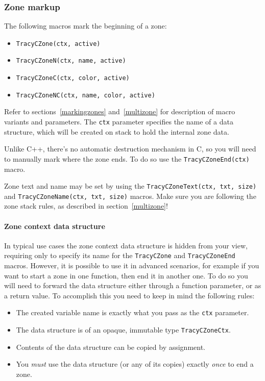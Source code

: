 \documentclass[hidelinks,titlepage,a4paper]{article}
\begin{document}
\subsubsection{Zone markup}

The following macros mark the beginning of a zone:

\begin{itemize}
\item \texttt{TracyCZone(ctx, active)}
\item \texttt{TracyCZoneN(ctx, name, active)}
\item \texttt{TracyCZoneC(ctx, color, active)}
\item \texttt{TracyCZoneNC(ctx, name, color, active)}
\end{itemize}

Refer to sections~\ref{markingzones} and~\ref{multizone} for description of macro variants and parameters. The \texttt{ctx} parameter specifies the name of a data structure, which will be created on stack to hold the internal zone data.

Unlike C++, there's no automatic destruction mechanism in C, so you will need to manually mark where the zone ends. To do so use the \texttt{TracyCZoneEnd(ctx)} macro.

Zone text and name may be set by using the \texttt{TracyCZoneText(ctx, txt, size)} and \texttt{TracyCZoneName(ctx, txt, size)} macros. Make sure you are following the zone stack rules, as described in section~\ref{multizone}!

\paragraph{Zone context data structure}

In typical use cases the zone context data structure is hidden from your view, requiring only to specify its name for the \texttt{TracyCZone} and \texttt{TracyCZoneEnd} macros. However, it is possible to use it in advanced scenarios, for example if you want to start a zone in one function, then end it in another one. To do so you will need to forward the data structure either through a function parameter, or as a return value. To accomplish this you need to keep in mind the following rules:

\begin{itemize}
\item The created variable name is exactly what you pass as the \texttt{ctx} parameter.
\item The data structure is of an opaque, immutable type \texttt{TracyCZoneCtx}.
\item Contents of the data structure can be copied by assignment.
\item You \emph{must} use the data structure (or any of its copies) exactly \emph{once} to end a zone.
\end{itemize}
\end{document}
